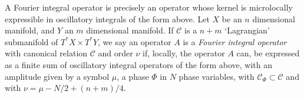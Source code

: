 %
%
% 







%
%
%
%

A Fourier integral operator is precisely an operator whose kernel is microlocally expressible in oscillatory integrals of the form above. Let $X$ be an $n$ dimensional manifold, and $Y$ an $m$ dimensional manifold. If $\mathcal{C}$ is a $n + m$ `Lagrangian' submanifold of $T^* X \times T^* Y$, we say an operator $A$ is a \emph{Fourier integral operator} with canonical relation $\mathcal{C}$ and order $\nu$ if, locally, the operator $A$ can, be expressed as a finite sum of oscillatory integral operators of the form above, with an amplitude given by a symbol $\mu$, a phase $\Phi$ in $N$ phase variables, with $\mathcal{C}_\Phi \subset \mathcal{C}$ and with $\nu = \mu - N/2 + (n+m)/4$.

